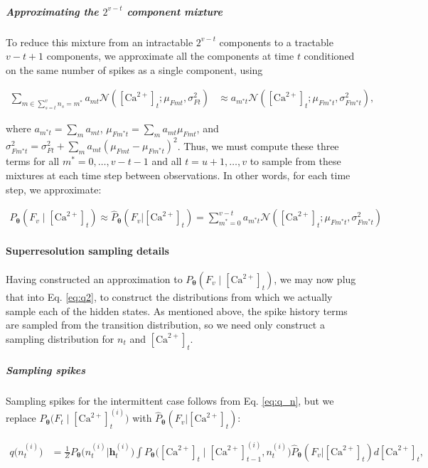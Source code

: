 \documentclass[12pt]{article}
\providecommand{\ve}[1]{\boldsymbol{#1}}
\providecommand{\ve}[1]{\boldsymbol{#1}}
\newcommand{\thetn}{\ve{\theta}}
\newcommand{\p}{P_{\thetn}}
\newcommand{\phat}{\widehat{P}_{\thetn}(F_v | \Ca_t)}
\newcommand{\m}{m^{\ast}}
\newcommand{\Ca}{[\text{Ca}^{2+}]}
\begin{document}
\subparagraph{Approximating the $2^{v-t}$ component mixture}

To reduce this mixture from an intractable $2^{v-t}$ components to a tractable $v-t+1$ components, we approximate all the components at time $t$ conditioned on the same number of spikes as a single component, using

\begin{align} \label{aeq:mix_approx1}
\sum_{m \in \sum_{s=t}^v n_s=m^\ast} a_{mt} \mathcal{N}(\Ca_t; \mu_{Fmt}, \sigma_{Ft}^2) &\approx a_{\m t} \mathcal{N}(\Ca_t; \mu_{F\m t}, \sigma_{F\m t}^2),
\end{align}

\noindent where $a_{\m t}=\sum_m a_{mt}$, $\mu_{F\m t}=\sum_m a_{mt} \mu_{Fmt}$, and $\sigma_{F \m t}^2 = \sigma_{Ft}^2 + \sum_m a_{mt} (\mu_{Fmt}-\mu_{F\m t})^2$.  Thus, we must compute these three terms for all $\m=0,\ldots,v-t-1$ and all $t=u+1,\ldots, v$ to sample from these mixtures at each time step between observations. In other words, for each time step, we approximate:

\begin{align} \label{eq:pF_approx}
\p(F_v \mid \Ca_t) \approx \phat = \sum_{\m =0}^{v-t} a_{\m t} \mathcal{N}(\Ca_t; \mu_{F \m t}, \sigma_{F \m t}^2)
\end{align}

\paragraph{Superresolution sampling details}

Having constructed an approximation to $\p(F_v \mid \Ca_t)$, we may now plug that into Eq. \ref{eq:q2}, to construct the distributions from which we actually sample each of the hidden states. As mentioned above, the spike history terms are sampled from the transition distribution,  so we need only construct a sampling distribution for $n_t$ and $\Ca_t$.   

\subparagraph{Sampling spikes}

Sampling spikes for the intermittent case follows from Eq. \ref{eq:q_n}, but we replace $\p \big(F_t \mid \Ca_t^{(i)} \big)$ with $\phat$:

\begin{align} \label{eq:q_n2}
q\big(n_t^{(i)}\big) &=\frac{1}{Z} \p \big( n_t^{(i)} | \ve{h}^{(i)}_t \big) \int \p \big( \Ca_t \mid \Ca^{(i)}_{t-1}, n_t^{(i)} \big) \phat d\Ca_t,
\end{align}
\end{document}

